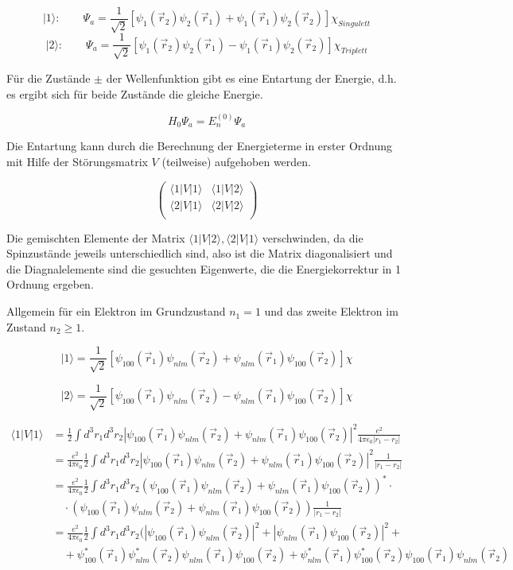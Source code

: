 \[|1\rangle: \qquad \Psi_a = \frac{1}{\sqrt{2}}  [\psi_1(\vec r_2)\psi_2(\vec r_1)  + \psi_1(\vec r_1) \psi_2(\vec r_2)] \chi_{Singulett}\]
\[|2\rangle: \qquad \Psi_a = \frac{1}{\sqrt{2}}  [\psi_1(\vec r_2)\psi_2(\vec r_1)  - \psi_1(\vec r_1) \psi_2(\vec r_2)] \chi_{Triplett}\]


Für die Zustände \(\pm\) der Wellenfunktion gibt es eine Entartung der Energie, d.h. es ergibt sich für beide Zustände die gleiche Energie.

\[ H_0\Psi_a = E_n^{(0)}\Psi_a\]

Die Entartung kann durch die Berechnung der Energieterme in erster Ordnung mit Hilfe der Störungsmatrix \(V\) (teilweise) aufgehoben werden. 

\[\begin{pmatrix} \langle 1|V|1\rangle & \langle 1|V|2\rangle \\
 \langle 2|V|1\rangle & \langle 2|V|2\rangle \\
\end{pmatrix} 
 \]

Die gemischten Elemente der Matrix \(\langle 1|V|2\rangle,\langle 2|V|1\rangle \)  verschwinden, da die Spinzustände jeweils unterschiedlich sind, also ist die Matrix diagonalisiert und die Diagnalelemente sind die gesuchten Eigenwerte, die die Energiekorrektur in 1 Ordnung ergeben.

Allgemein für ein Elektron im Grundzustand \(n_1=1\)  und das zweite Elektron im Zustand \(n_2\geq 1\).

\[|1\rangle  = \frac{1}{\sqrt{2}}  [\psi_{100}(\vec r_1)\psi_{nlm}(\vec r_2)  + \psi_{nlm}(\vec r_1) \psi_{100}(\vec r_2)] \chi \]

\[|2\rangle  = \frac{1}{\sqrt{2}}  [\psi_{100}(\vec r_1)\psi_{nlm}(\vec r_2)  - \psi_{nlm}(\vec r_1) \psi_{100}(\vec r_2)] \chi \]

\begin{align}
\langle 1|V|1\rangle &= \frac{1}{2} \int d^3 r_1 d^3r_2 |\psi_{100}(\vec r_1)\psi_{nlm}(\vec r_2)  + \psi_{nlm}(\vec r_1) \psi_{100}(\vec r_2)|^2  \frac{ e^2}{4\pi\epsilon_0 |r_1-r_2|} \\
&=\frac{ e^2}{4\pi\epsilon_0 }  \frac{1}{2} \int d^3 r_1 d^3r_2 |\psi_{100}(\vec r_1)\psi_{nlm}(\vec r_2)  + \psi_{nlm}(\vec r_1) \psi_{100}(\vec r_2)|^2  \frac{ 1}{|r_1-r_2|} \\
&=\frac{ e^2}{4\pi\epsilon_0 }  \frac{1}{2} \int d^3 r_1 d^3r_2 (\psi_{100}(\vec r_1)\psi_{nlm}(\vec r_2)  + \psi_{nlm}(\vec r_1) \psi_{100}(\vec r_2))^*\cdot\\
&\quad \cdot (\psi_{100}(\vec r_1)\psi_{nlm}(\vec r_2)  + \psi_{nlm}(\vec r_1) \psi_{100}(\vec r_2))   \frac{ 1}{|r_1-r_2|} \\
&=\frac{ e^2}{4\pi\epsilon_0 }  \frac{1}{2} \int d^3 r_1 d^3r_2 ( |\psi_{100}(\vec r_1)\psi_{nlm}(\vec r_2)|^2+|\psi_{nlm}(\vec r_1) \psi_{100}(\vec r_2)|^2+\\
&\quad + \psi_{100}^*(\vec r_1)\psi_{nlm}^*(\vec r_2) \psi_{nlm}(\vec r_1) \psi_{100}(\vec r_2) + \psi_{nlm}^*(\vec r_1) \psi_{100}^*(\vec r_2)\psi_{100}(\vec r_1)\psi_{nlm}(\vec r_2)
\end{align}

